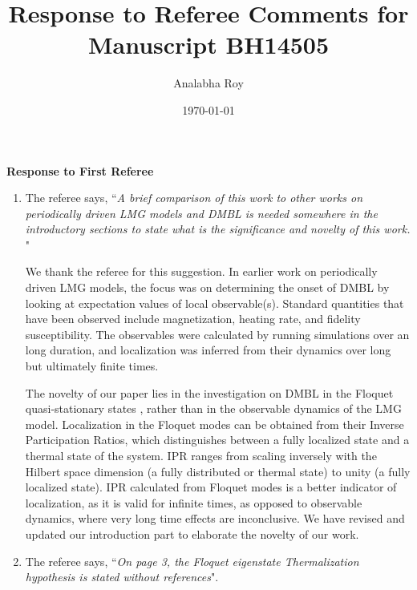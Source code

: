 \documentclass[aps,prb,reprint,showpacs,floatfix,superscriptaddress, onecolumn, nofootinbib, 9pt]{revtex4-2}
\newcommand{\response}[1]{{\color{black}#1}} %
\newcommand{\comment}[1]{{\color{blue}#1}} %
\begin{document}

\title{Response to Referee Comments for Manuscript BH14505}
\author{Analabha Roy}
\date{\today}

\maketitle

\vspace{1em}

\noindent \textbf{Response to First Referee}

\begin{enumerate}
\item The referee says, \comment{``\textit{A brief comparison of this work to other works on periodically driven LMG models and DMBL is needed somewhere in the introductory sections to state what is the significance and novelty of this work. }"}\\

\response{
	We thank the referee for this suggestion. In earlier work on periodically driven LMG models,
	the focus was on determining the onset of DMBL by looking at expectation values of local
	observable(s). Standard quantities that have been observed include magnetization, heating rate, and fidelity susceptibility. The observables were calculated by running simulations over an long duration, and localization was inferred from their dynamics over long but ultimately finite times.
	
	The novelty of our paper lies in the investigation on DMBL in the Floquet quasi-stationary states , rather than in the observable dynamics of the LMG model. Localization in the Floquet modes can be obtained from their Inverse Participation Ratios, which distinguishes between a fully localized state and a thermal state of the system. IPR ranges from scaling inversely with the Hilbert space dimension (a fully distributed or thermal state) to unity (a fully localized state). IPR calculated from Floquet modes is a better indicator of localization, as it is valid for infinite times, as opposed to observable dynamics, where very long time effects are inconclusive. We have revised and updated our introduction part to elaborate the novelty of our work.
}

\item The referee says, \comment{``\textit{On page 3, the Floquet eigenstate Thermalization hypothesis is stated without references}".}\\


\end{enumerate}
\end{document}
